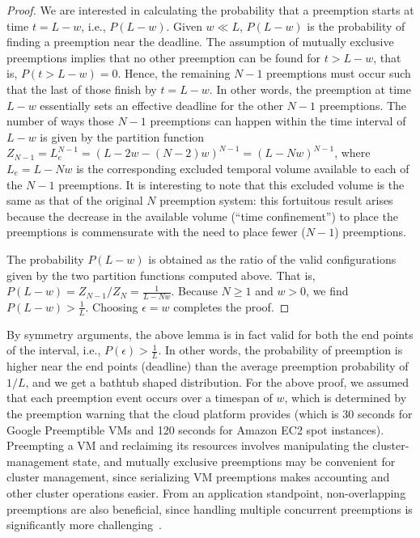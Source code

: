 \documentclass[compsoc]{IEEEtran}
\begin{document}
\begin{proof}
We are interested in calculating the probability that a preemption starts at time $t=L-w$, i.e., $P(L-w)$. Given $w \ll L$, $P(L-w)$ is the probability of finding a preemption near the deadline. The assumption of mutually exclusive preemptions implies that no other preemption can be found for $t > L - w$, that is, $P(t> L-w) = 0$. Hence, the remaining $N-1$ preemptions must occur such that the last of those finish by $t=L-w$. In other words, the preemption at time $L-w$ essentially sets an effective deadline for the other $N-1$ preemptions. The number of ways those $N-1$ preemptions can happen within the time interval of $L-w$ is given by the partition function $Z_{N-1} = L_e^{N-1}= (L-2w - (N-2)w)^{N-1} = (L - Nw)^{N-1}$, where $L_e = L - Nw$ is the corresponding excluded temporal volume available to each of the $N-1$ preemptions.
It is interesting to note that this excluded volume
is the same as that of the original $N$ preemption system: this fortuitous result arises because the decrease in the available volume (``time confinement'') to place the preemptions is commensurate with the need to place fewer ($N-1$) preemptions.

The probability $P(L-w)$ is obtained as the ratio of the valid configurations given by the two partition functions computed above.
That is, $P(L-w) = Z_{N-1}/ {Z_N} = \frac{1}{L - Nw}$. Because $N \geq 1$ and $w>0$, we find $P(L-w) > \frac{1}{L}$. Choosing $\epsilon = w$ completes the proof.
\end{proof}

By symmetry arguments, the above lemma is in fact valid for both the end points of the interval, i.e., $P(\epsilon) > \frac{1}{L}$.
In other words, the probability of preemption is higher near the end points (deadline) than the average preemption probability of $1/L$, and we get a bathtub shaped distribution.
For the above proof, we assumed that each preemption event occurs over a timespan of $w$, which is determined by the preemption warning that the cloud platform provides (which is 30 seconds for Google Preemptible VMs and 120 seconds for Amazon EC2 spot instances). 
Preempting a VM and reclaiming its resources involves manipulating the cluster-management state, and mutually exclusive preemptions may be convenient for cluster management, since serializing VM preemptions makes accounting and other cluster operations easier.
From an application standpoint, non-overlapping preemptions are also beneficial, since handling multiple concurrent preemptions is significantly more challenging~\cite{exosphere}. 
\end{document}
